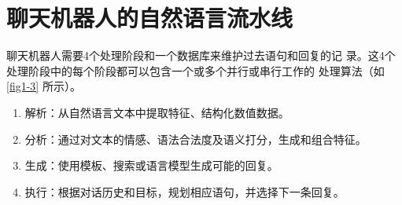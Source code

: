 
\section{聊天机器人的自然语言流水线}
聊天机器人需要4个处理阶段和一个数据库来维护过去语句和回复的记
录。这4个处理阶段中的每个阶段都可以包含一个或多个并行或串行工作的
处理算法（如 \autoref{fig1-3} 所示）。
\begin{enumerate}
    \item 解析：从自然语言文本中提取特征、结构化数值数据。
    \item 分析：通过对文本的情感、语法合法度及语义打分，生成和组合特征。
    \item 生成：使用模板、搜索或语言模型生成可能的回复。
    \item 执行：根据对话历史和目标，规划相应语句，并选择下一条回复。
\end{enumerate}

